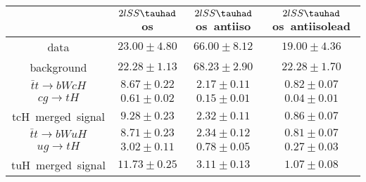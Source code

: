 \centering
\begin{tabular}{|c|c|c|c|} \hline
 & $2lSS\tauhad$ os & $2lSS\tauhad$ os~antiiso & $2lSS\tauhad$ os~antiisolead\\\hline
data & $23.00\pm4.80$ & $66.00\pm8.12$ & $19.00\pm4.36$\\\hline
background & $22.28\pm1.13$ & $68.23\pm2.90$ & $22.28\pm1.70$\\\hline
$\bar{t}t\to bWcH$ & $8.67\pm0.22$ & $2.17\pm0.11$ & $0.82\pm0.07$\\\hline
$cg\to tH$ & $0.61\pm0.02$ & $0.15\pm0.01$ & $0.04\pm0.01$\\\hline
tcH~merged~signal & $9.28\pm0.23$ & $2.32\pm0.11$ & $0.86\pm0.07$\\\hline
$\bar{t}t\to bWuH$ & $8.71\pm0.23$ & $2.34\pm0.12$ & $0.81\pm0.07$\\\hline
$ug\to tH$ & $3.02\pm0.11$ & $0.78\pm0.05$ & $0.27\pm0.03$\\\hline
tuH~merged~signal & $11.73\pm0.25$ & $3.11\pm0.13$ & $1.07\pm0.08$\\\hline
\end{tabular}
